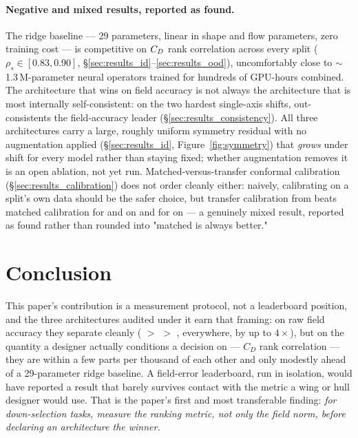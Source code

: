 \documentclass[11pt,a4paper]{article}
\begin{document}
\paragraph{Negative and mixed results, reported as found.} The ridge baseline
--- 29 parameters, linear in shape and flow parameters, zero training cost ---
is competitive on $C_D$ rank correlation across every split
($\rho_s\in[0.83,0.90]$, \S\ref{sec:results_id}--\ref{sec:results_ood}),
uncomfortably close to $\sim$1.3\,M-parameter neural operators trained for
hundreds of GPU-hours combined. The architecture that wins on field accuracy is
not always the architecture that is most internally self-consistent: on the two
hardest single-axis shifts, \Mfno{} out-consistents the field-accuracy leader
\Mtrans{} (\S\ref{sec:results_consistency}). All three architectures carry a
large, roughly uniform symmetry residual with no augmentation applied
(\S\ref{sec:results_id}, Figure~\ref{fig:symmetry}) that \emph{grows} under
shift for every model rather than staying fixed; whether augmentation removes
it is an open ablation, not yet run. Matched-versus-transfer conformal
calibration (\S\ref{sec:results_calibration}) does not order cleanly either:
naively, calibrating on a split's own data should be the safer choice, but
transfer calibration from  beats matched calibration for
\Mgnn{} and \Mfno{} on  and for \Mfno{} on
 --- a genuinely mixed result, reported as found rather than
rounded into "matched is always better." 

\section{Conclusion}
\label{sec:conclusion}

This paper's contribution is a measurement protocol, not a leaderboard
position, and the three architectures audited under it earn that framing: on
raw field accuracy they separate cleanly (\Mtrans{} $>$ \Mfno{} $>$ \Mgnn,
everywhere, by up to $4\times$), but on the quantity a designer actually
conditions a decision on --- $C_D$ rank correlation --- they are within a few
parts per thousand of each other and only modestly ahead of a 29-parameter
ridge baseline. A field-error leaderboard, run in isolation, would have
reported a result that barely survives contact with the metric a wing or hull
designer would use. That is the paper's first and most transferable finding:
\emph{for down-selection tasks, measure the ranking metric, not only the field
norm, before declaring an architecture the winner.}
\end{document}
